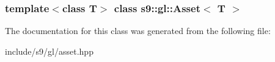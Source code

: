 \subsubsection*{template$<$class T$>$ class s9\-::gl\-::\-Asset$<$ T $>$}



\-The documentation for this class was generated from the following file\-:\begin{DoxyCompactItemize}
\item 
include/s9/gl/asset.\-hpp\end{DoxyCompactItemize}
